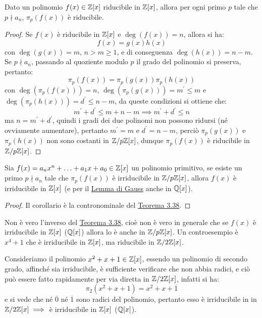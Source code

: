 \documentclass[11pt]{scrartcl}
\begin{document}
\begin{theorem}
\label{p:3.39}
Dato un polinomio $f(x) \in \mathbb Z[x]$ riducibile in $\mathbb Z[x]$, allora per ogni primo $p$ tale che $p \nmid a_n$, $\pi_p(f(x))$ è riducibile.
\end{theorem}

\begin{proof}
Se $f(x)$ è riducibile in $\mathbb Z[x]$ e $\deg(f(x)) = n$, allora si ha:
	\[ f(x) = g(x)h(x)
	\]
con $\deg(g(x)) = m$, $n>m\geq 1$, e di conseguenza $\deg(h(x)) = n-m$. Se $p\nmid a_n$, passando al quoziente modulo $p$ il grado del polinomio si preserva, pertanto:
	\[ \pi_p(f(x)) =  \pi_p(g(x)) \pi_p(h(x))
	\]
con $\deg( \pi_p(f(x))) = n$, $\deg( \pi_p(g(x))) = m^{\prime} \leq m$ e $\deg( \pi_p(h(x))) = d^{\prime} \leq n-m$, da queste condizioni si ottiene che:
	\[ m^{\prime} + d^{\prime} \leq m + n - m \implies m^{\prime} + d^{\prime} \leq n
	\]
ma $n = m^{\prime} + d^{\prime}$, quindi i gradi dei due polinomi non possono ridursi (né ovviamente aumentare), pertanto $m^{\prime} = m$ e $d^{\prime} = n -m$, perciò $\pi_p(g(x))$ e $\pi_p(h(x))$ non sono costanti in ${\mathbb Z}/p{\mathbb Z}[x]$, dunque $\pi_p(f(x))$ è riducibile in ${\mathbb Z}/p{\mathbb Z}[x]$.
\end{proof}

\begin{corollary}
Sia $f(x) = a_nx^n + \ldots + a_1x + a_0 \in \mathbb Z[x]$ un polinomio primitivo, se esiste un primo $p \nmid a_n$ tale che $\pi_p(f(x))$ è irriducibile in ${\mathbb Z}/p{\mathbb Z}[x]$, allora $f(x)$ è irriducibile in $\mathbb Z[x]$ (e per il \hyperref[p:Gauss]{Lemma di Gauss} anche in $\mathbb Q[x]$).
\end{corollary}

\begin{proof}
Il corollario è la contronominale del \hyperref[p:3.39]{Teorema 3.38}. 
\end{proof}

\begin{remark}
Non è vero l'inverso del \hyperref[p:3.39]{Teorema 3.38}, cioè non è vero in generale che se $f(x)$ è irriducibile in $\mathbb Z[x]$ ($\mathbb Q[x]$) allora lo è anche in ${\mathbb Z}/p{\mathbb Z}[x]$. Un controesempio è $x^4 + 1$ che è irriducibile in $\mathbb Z[x]$, ma riducibile in $\mathbb Z/2\mathbb Z[x]$.
\end{remark}

\begin{example}
Consideriamo il polinomio $x^2+x+1 \in \mathbb Z[x]$, essendo un polinomio di secondo grado, affinché sia irriducibile, è sufficiente verificare che non abbia radici, e ciò può essere fatto rapidamente per via diretta in $\mathbb Z/2\mathbb Z[x]$, infatti si ha:
	\[ \pi_2(x^2+x+1) = x^2+x+ \overline 1
	\]
e si vede che né $\overline 0$ né $\overline 1$ sono radici del polinomio, pertanto esso è irriducibile in in $\mathbb Z/2\mathbb Z[x] \implies$ è irriducibile in $\mathbb Z[x]$ ($\mathbb Q[x]$).
\end{example}
\end{document}
